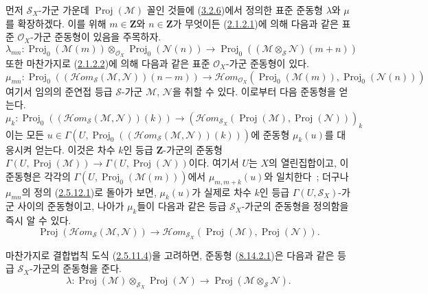 \begin{env}[8.14.2]
\label{II.8.14.2-ko}
먼저 $\mathcal{S}_X$-가군 가운데 $\operatorname{Proj}(\mathcal{M})$
꼴인 것들에 (\hyperref[II.3.2.6-ko]{3.2.6})에서 정의한 표준 준동형
$\lambda$와 $\mu$를 확장하겠다. 이를 위해
$m\in\mathbf{Z}$와 $n\in\mathbf{Z}$가 무엇이든
(\hyperref[II.2.1.2.1-ko]{2.1.2.1})에 의해 다음과 같은 표준
$\mathcal{O}_X$-가군 준동형이 있음을 주목하자.
\begin{equation}
\label{II.8.14.2.1-ko}
  \lambda_{mn}:\operatorname{Proj}_0(\mathcal{M}(m))
  \otimes_{\mathcal{O}_X}\operatorname{Proj}_0(\mathcal{N}(n))
  \to\operatorname{Proj}_0
  ((\mathcal{M}\otimes_{\mathcal{S}}\mathcal{N})(m+n))
\tag{8.14.2.1}
\end{equation}
또한 마찬가지로 (\hyperref[II.2.1.2.2-ko]{2.1.2.2})에 의해 다음과 같은
표준 $\mathcal{O}_X$-가군 준동형이 있다.
\begin{equation}
\label{II.8.14.2.2-ko}
  \mu_{mn}:\operatorname{Proj}_0
  ((\mathcal{H}om_{\mathcal{S}}(\mathcal{M},\mathcal{N}))(n-m))
  \to\mathcal{H}om_{\mathcal{O}_X}
  (\operatorname{Proj}_0(\mathcal{M}(m)),
   \operatorname{Proj}_0(\mathcal{N}(n)))
\tag{8.14.2.2}
\end{equation}
여기서 임의의 준연접 등급 $\mathcal{S}$-가군 $\mathcal{M}$,
$\mathcal{N}$을 취할 수 있다. 이로부터 다음 준동형을 얻는다.
\[
  \mu_k:\operatorname{Proj}_0
  ((\mathcal{H}om_{\mathcal{S}}(\mathcal{M},\mathcal{N}))(k))
  \to
  (\mathcal{H}om_{\mathcal{S}_X}
  (\operatorname{Proj}(\mathcal{M}),\operatorname{Proj}(\mathcal{N})))_k
\]
이는 모든
$u\in\Gamma(U,\operatorname{Proj}_0
((\mathcal{H}om_{\mathcal{S}}(\mathcal{M},\mathcal{N}))(k)))$에 준동형
$\mu_k(u)$를 대응시켜 얻는다. 이것은 차수 $k$인 등급
$\mathbf{Z}$-가군의 준동형
$\Gamma(U,\operatorname{Proj}(\mathcal{M}))\to
\Gamma(U,\operatorname{Proj}(\mathcal{N}))$이다. 여기서 $U$는 $X$의
열린집합이고, 이 준동형은 각각의
$\Gamma(U,\operatorname{Proj}_0(\mathcal{M}(m)))$에서
$\mu_{m,m+k}(u)$와 일치한다~; 더구나 $\mu_{mn}$의 정의
(\hyperref[II.2.5.12.1-ko]{2.5.12.1})로 돌아가 보면,
$\mu_k(u)$가 실제로 차수 $k$인 등급 $\Gamma(U,\mathcal{S}_X)$-가군
사이의 준동형이고, 나아가 $\mu_k$들이 다음과 같은 등급
$\mathcal{S}_X$-가군의 준동형을 정의함을 즉시 알 수 있다.
\begin{equation}
\label{II.8.14.2.3-ko}
  \operatorname{Proj}
  (\mathcal{H}om_{\mathcal{S}}(\mathcal{M},\mathcal{N}))
  \to\mathcal{H}om_{\mathcal{S}_X}
  (\operatorname{Proj}(\mathcal{M}),\operatorname{Proj}(\mathcal{N})).
\tag{8.14.2.3}
\end{equation}

마찬가지로 결합법칙 도식
(\hyperref[II.2.5.11.4-ko]{2.5.11.4})을 고려하면, 준동형
(\hyperref[II.8.14.2.1-ko]{8.14.2.1})은 다음과 같은 등급
$\mathcal{S}_X$-가군의 준동형을 준다.
\begin{equation}
\label{II.8.14.2.4-ko}
  \lambda:\operatorname{Proj}(\mathcal{M})
  \otimes_{\mathcal{S}_X}\operatorname{Proj}(\mathcal{N})
  \to\operatorname{Proj}(\mathcal{M}\otimes_{\mathcal{S}}\mathcal{N}).
\tag{8.14.2.4}
\end{equation}
\end{env}

